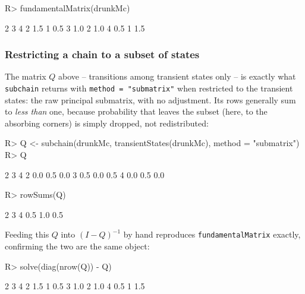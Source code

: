 \documentclass[
  nojss]{jss}
\begin{document}
\begin{CodeChunk}
\begin{CodeInput}
R> fundamentalMatrix(drunkMc)
\end{CodeInput}
\begin{CodeOutput}
    2 3   4
2 1.5 1 0.5
3 1.0 2 1.0
4 0.5 1 1.5
\end{CodeOutput}
\end{CodeChunk}

\subsubsection{Restricting a chain to a subset of states}\label{restricting-a-chain-to-a-subset-of-states}

The matrix \(Q\) above -- transitions among transient states only -- is
exactly what \texttt{subchain} returns with \texttt{method\ =\ "submatrix"} when restricted
to the transient states: the raw principal submatrix, with no adjustment.
Its rows generally sum to \emph{less than} one, because probability that leaves
the subset (here, to the absorbing corners) is simply dropped, not
redistributed:

\begin{CodeChunk}
\begin{CodeInput}
R> Q <- subchain(drunkMc, transientStates(drunkMc), method = "submatrix")
R> Q
\end{CodeInput}
\begin{CodeOutput}
    2   3   4
2 0.0 0.5 0.0
3 0.5 0.0 0.5
4 0.0 0.5 0.0
\end{CodeOutput}
\begin{CodeInput}
R> rowSums(Q)
\end{CodeInput}
\begin{CodeOutput}
  2   3   4 
0.5 1.0 0.5 
\end{CodeOutput}
\end{CodeChunk}

Feeding this \(Q\) into \((I-Q)^{-1}\) by hand reproduces \texttt{fundamentalMatrix}
exactly, confirming the two are the same object:

\begin{CodeChunk}
\begin{CodeInput}
R> solve(diag(nrow(Q)) - Q)
\end{CodeInput}
\begin{CodeOutput}
    2 3   4
2 1.5 1 0.5
3 1.0 2 1.0
4 0.5 1 1.5
\end{CodeOutput}
\end{CodeChunk}
\end{document}
